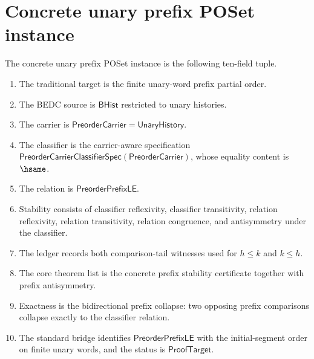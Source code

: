\section{Concrete unary prefix POSet instance}
\label{sec:poset-concrete-unary-prefix-instance}

\begin{definition}
\label{def:concrete-unary-prefix-poset-instance}
The concrete unary prefix POSet instance is the following ten-field tuple.
\begin{enumerate}
  \item The traditional target is the finite unary-word prefix partial order.
  \item The BEDC source is $\mathsf{BHist}$ restricted to unary histories.
  \item The carrier is $\mathsf{PreorderCarrier}=\mathsf{UnaryHistory}$.
  \item The classifier is the carrier-aware specification $\mathsf{PreorderCarrierClassifierSpec}(\mathsf{PreorderCarrier})$, whose equality content is $\hsame$.
  \item The relation is $\mathsf{PreorderPrefixLE}$.
  \item Stability consists of classifier reflexivity, classifier transitivity, relation reflexivity, relation transitivity, relation congruence, and antisymmetry under the classifier.
  \item The ledger records both comparison-tail witnesses used for $h\le k$ and $k\le h$.
  \item The core theorem list is the concrete prefix stability certificate together with prefix antisymmetry.
  \item Exactness is the bidirectional prefix collapse: two opposing prefix comparisons collapse exactly to the classifier relation.
  \item The standard bridge identifies $\mathsf{PreorderPrefixLE}$ with the initial-segment order on finite unary words, and the status is $\mathsf{ProofTarget}$.
\end{enumerate}
\end{definition}

